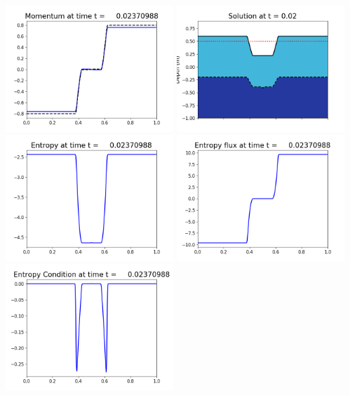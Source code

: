 \documentclass[11pt]{article}
\begin{document}
\vskip 10pt 
\includegraphics[width=0.475\textwidth]{frame0066fig1003.png}
\includegraphics[width=0.475\textwidth]{frame0066fig1006.png}
\vskip 10pt 
\includegraphics[width=0.475\textwidth]{frame0066fig1007.png}
\includegraphics[width=0.475\textwidth]{frame0066fig1008.png}
\vskip 10pt 
\includegraphics[width=0.475\textwidth]{frame0066fig1009.png}
\end{document}
